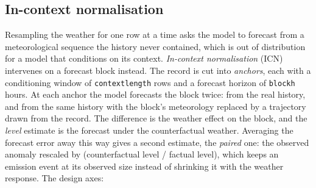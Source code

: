 \documentclass[11pt]{report}
\newcommand{\codeunderscore}{\textunderscore\allowbreak}
\newcommand{\code}[1]{\texttt{\let\_\codeunderscore #1}}
\begin{document}
\subsection{In-context normalisation}\label{sec:icntheory}
Resampling the weather for one row at a time asks the model to forecast from a
meteorological sequence the history never contained, which is out of distribution for a
model that conditions on its context. \emph{In-context normalisation} (ICN) intervenes
on a forecast block instead. The record is cut into \emph{anchors}, each with a
conditioning window of \code{context\_length} rows and a forecast horizon of
\code{block\_h} hours. At each anchor the model forecasts the block twice: from the
real history, and from the same history with the block's meteorology replaced by a
trajectory drawn from the record. The difference is the weather effect on the block,
and the \emph{level} estimate is the forecast under the counterfactual weather.
Averaging the forecast error away this way gives a second estimate, the \emph{paired}
one: the observed anomaly rescaled by (counterfactual level / factual level), which
keeps an emission event at its observed size instead of shrinking it with the weather
response. The design axes:
\end{document}
